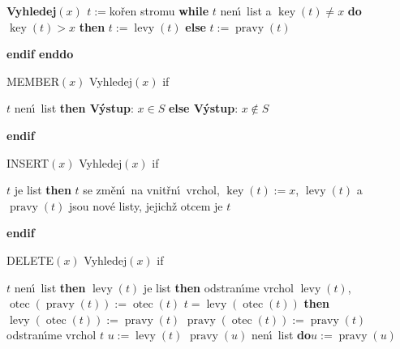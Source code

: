 \documentclass[a4paper,12pt]{article}
\DeclareMathOperator*{\otec}{otec}
\DeclareMathOperator*{\levy}{levy}
\DeclareMathOperator*{\pravy}{pravy}
\DeclareMathOperator*{\key}{key}
\begin{document}
{\bf Vyhledej$(x)$\newline 
$t:=$}ko\v ren stromu\newline 
{\bf while} $t$ nen\'\i\ list a $\key(t)\ne x$ {\bf do}\newline 
\phantom{---}{\bf if} $\key(t)>x$ {\bf then} $t:=\levy(t)$ {\bf else} $t:=\pravy(t)$ {\bf endif\newline 
enddo
\medskip

MEMBER$(x)$\newline 
Vyhledej$(x)$\newline 
if} $t$ nen\'\i\ list {\bf then V\'ystup}: $x\in S$ {\bf else V\'ystup}: $
x\notin S$ {\bf endif
\medskip

INSERT$(x)$\newline 
Vyhledej$(x)$\newline 
if} $t$ je list {\bf then}\newline 
$t$ se zm\v en\'\i\ na vnit\v rn\'\i\ vrchol, $\key(t):=x$,\newline 
$\levy(t)$ a $\pravy(t)$ jsou nov\'e listy, jejich\v z otcem je $t$\newline 
{\bf endif
\medskip

DELETE$(x)$\newline 
Vyhledej$(x)$\newline 
if} $t$ nen\'\i\ list {\bf then}\newline 
\phantom{---}{\bf if} $\levy(t)$ je list {\bf then\newline}
\phantom{------}odstran\'\i me vrchol $\levy(t)$, $\otec(\pravy(t)):=\otec(t)$\newline 
\phantom{------}{\bf if} $t=\levy(\otec(t))$ {\bf then}\newline
\phantom{---------}$\levy(\otec(t)):=\pravy(t)$\newline 
\phantom{------}{\bf else}\newline 
\phantom{---------}$\pravy(\otec(t)):=\pravy(t)$\newline 
\phantom{------}{\bf endif\newline}
\phantom{------}odstran\'\i me vrchol $t$\newline 
\phantom{---}{\bf else}\newline 
\phantom{------}$u:=\levy(t)$\newline 
\phantom{------}{\bf while} $\pravy(u)$ nen\'\i\ list {\bf do}\newline \phantom{---------}$u:=\pravy(u)$\newline 
\phantom{------}{\bf enddo}\newline 
\end{document}
